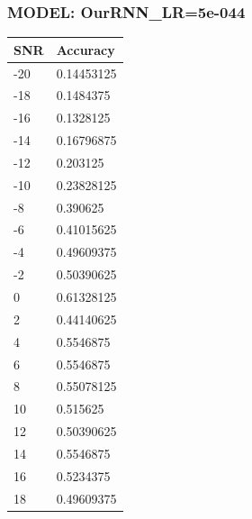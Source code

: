 \documentclass[12pt,a4paper]{article}
\begin{document}
    \subsubsection{MODEL: OurRNN_LR=5e-044}
    \begin{table}[!ht]
    \raggedright
    \begin{tabular}{|l|l|}
    \hline
        SNR & Accuracy \\ \hline
        -20 & 0.14453125 \\ \hline
        -18 & 0.1484375 \\ \hline
        -16 & 0.1328125 \\ \hline
        -14 & 0.16796875 \\ \hline
        -12 & 0.203125 \\ \hline
        -10 & 0.23828125 \\ \hline
        -8 & 0.390625 \\ \hline
        -6 & 0.41015625 \\ \hline
        -4 & 0.49609375 \\ \hline
        -2 & 0.50390625 \\ \hline
        0 & 0.61328125 \\ \hline
        2 & 0.44140625 \\ \hline
        4 & 0.5546875 \\ \hline
        6 & 0.5546875 \\ \hline
        8 & 0.55078125 \\ \hline
        10 & 0.515625 \\ \hline
        12 & 0.50390625 \\ \hline
        14 & 0.5546875 \\ \hline
        16 & 0.5234375 \\ \hline
        18 & 0.49609375 \\ \hline
    \end{tabular}
\end{table}
    \newpage
\end{document}
